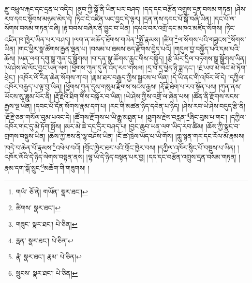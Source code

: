 རྫུ་འཕྲུལ་རྐང་དང་དྲན་པ་འདིར། །ནུབ་ཀྱི་སྒོ་ནི་ཡིན་པར་བཤད། །དད་དང་བརྩོན་འགྲུས་དྲན་བསམ་གཏན། །ཤེས་རབ་དབང་སྟོབས་མཉམ་མེད་དེ། །ཏིང་ངེ་འཛིན་ཡང་བྱང་དེ་ལྟར། །དྲན་ནས་དབང་པོ་སྒོ་བཞི་ཡིན། །དང་པོ་ལ་སོགས་བསམ་གཏན་བཞི། །རྟ་བབས་བཞིར་ནི་བྱུང་བ་ཡིན། །དཔའ་བར་འགྲོ་དང་མཁའ་མཛོད་སོགས། །ཏིང་འཛིན་ཁ་ཁྱེར་ཡིན་པར་བཤད། །ལག་ན་མཆོད་ཐོགས་གཡེན་\footnote{གཡཾ་  ཅོ་ནེ། གཡོན་  སྣར་ཐང་། }སྤྱོ་རྣམས། །ཚིག་\footnote{ཚིགས་  སྣར་ཐང་། }ལ་སོགས་པའི་གཟུངས་\footnote{གཟུང་  སྣར་ཐང་།  པེ་ཅིན། }སོགས་ཡིན། །གང་ཕྱིར་སྣ་ཚོགས་རྒྱན་ལྡན་པ། །བསམ་པ་ཐམས་ཅད་རྫོགས་བྱེད་པའོ། །གདུལ་བྱ་བསྐྱོད་པའི་དམ་པའི་ཆོས། །ཡན་ལག་དགུ་སྒྲ་ཀུན་དུ་སྒྲོགས། །བ་དན་སྣ་ཚོགས་རླུང་གིས་བསྐྱོད། །རྩེ་མོར་དྲིལ་བཏགས་སྒྲ་སྒྲོགས་ཡིན། །ཡེ་ཤེས་མེ་ལོང་བྱང་ཡན་ལག །ཕྱོགས་ཀུན་དུ་ནི་འོད་རབ་གསལ། །དྲ་བ་དྲ་ཕྱེད་ཉི་ཟླ་དང་། །རྔ་ཡབ་མེ་ལོང་མེ་ཏོག་ཕྲེང་། །འཁོར་ལོ་རིན་ཆེན་སོགས་ཀ་བ། །རྣམ་ཐར་བརྒྱད་ཀྱིས་སྦྱངས་པ་ཡིན། །དེ་ཡི་ནང་གི་འཁོར་ལོ་དེ། །དཀྱིལ་འཁོར་བརྒྱད་པ་ལྟ་བུ་ཡིན། །ཕྱོགས་ཀུན་དུས་གསུམ་རྫོགས་སངས་རྒྱས། །རྡོ་རྗེ་ཐེག་པ་རབ་སྟོན་པས། །ཀུན་ནས་ཡོངས་སུ་ཟླུམ་པོར་ནི། །རྡོ་རྗེའི་ཐིག་གིས་བསྐོར་བ་ཡིན། །ཡེ་ཤེས་ཀྱིས་འགྲོ་ལ་ཞེན་པས། །ཚོན་ནི་རྫོགས་སངས་རྒྱས་ལྔ་ཡིན། །དབང་པོ་དོན་སོགས་རྣམ་དག་པ། །རང་གི་མཚན་ཉིད་དབེན་པ་ཉིད། །ཤེས་རབ་ཡེ་ཤེས་བདུད་རྩི་ནི། །རྡོ་རྗེ་ཅན་གསོལ་བུམ་པའང་དེ། །ཚོགས་རྫོགས་པ་ཡི་རྒྱུ་མཐུན་པ། །ཐུགས་རྗེས་བརླན་\footnote{རླན་  སྣར་ཐང་།  པེ་ཅིན། }ཞིང་བུམ་པ་གང་། །དཀྱིལ་འཁོར་གང་དུ་མེ་ཏོག་སྤོས། །མར་མེ་ཆེ་དང་དྲིར་བཤད་པ། །བྱང་ཆུབ་ཡན་ལག་ཡིད་རབ་ཚིམ། །ཆོས་ཀྱི་སྣང་བ་གྲགས་བསྡུས་ཡིན། །ཆོས་ཀྱི་ཟས་ནི་ལྷ་བཤོས་ཡིན། །ངོ་ཚ་ཁྲེལ་ཡོད་པ་ཡི་གོས། །གླུ་སྙན་གར་དང་རོལ་མོ་རྣམས། །བདེ་བ་ཆེན་པོ་རྣམས་\footnote{རྣཾ་  སྣར་ཐང་། རྣམ་  པེ་ཅིན། }འཕེལ་བའོ། །གྲོང་ཁྱེར་ཐར་པའི་གྲོང་ཁྱེར་བས། །དཀྱིལ་འཁོར་སྙིང་པོ་བསྡུས་པ་ཡིན། །འཁོར་ལོའི་དེ་ཉིད་ལེགས་བསྟན་ནས། །ལྷ་ཡི་དེ་ཉིད་བསྟན་པར་བྱ། །དད་དང་བརྩོན་འགྲུས་དྲན་བསམ་གཏན། །རྣམ་དག་སྒོ་སྲུང་\footnote{སྲུངས་  སྣར་ཐང་།  པེ་ཅིན། }མཆོག་གི་གཟུགས། །
